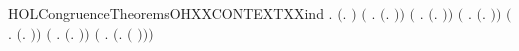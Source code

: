 \begin{SaveVerbatim}{HOLCongruenceTheoremsOHXXCONTEXTXXind}
\HOLTokenTurnstile{} \HOLSymConst{\HOLTokenForall{}}.
        \ensuremath{(}\HOLTokenLambda{}. \ensuremath{)} \HOLSymConst{\HOLTokenConj{}}
       \ensuremath{(}\HOLSymConst{\HOLTokenForall{}} .   \HOLSymConst{\HOLTokenImp{}}  \ensuremath{(}\HOLTokenLambda{}. \HOLSymConst{\ensuremath{\ldotp}} \ensuremath{)}\ensuremath{)} \HOLSymConst{\HOLTokenConj{}}
       \ensuremath{(}\HOLSymConst{\HOLTokenForall{}} .   \HOLSymConst{\HOLTokenImp{}}  \ensuremath{(}\HOLTokenLambda{}.   \HOLSymConst{\ensuremath{+}} \ensuremath{)}\ensuremath{)} \HOLSymConst{\HOLTokenConj{}}
       \ensuremath{(}\HOLSymConst{\HOLTokenForall{}} .   \HOLSymConst{\HOLTokenImp{}}  \ensuremath{(}\HOLTokenLambda{}.  \HOLSymConst{\ensuremath{+}}  \ensuremath{)}\ensuremath{)} \HOLSymConst{\HOLTokenConj{}}
       \ensuremath{(}\HOLSymConst{\HOLTokenForall{}} .   \HOLSymConst{\HOLTokenImp{}}  \ensuremath{(}\HOLTokenLambda{}.   \HOLSymConst{\ensuremath{\mid}} \ensuremath{)}\ensuremath{)} \HOLSymConst{\HOLTokenConj{}}
       \ensuremath{(}\HOLSymConst{\HOLTokenForall{}} .   \HOLSymConst{\HOLTokenImp{}}  \ensuremath{(}\HOLTokenLambda{}.  \HOLSymConst{\ensuremath{\mid}}  \ensuremath{)}\ensuremath{)} \HOLSymConst{\HOLTokenConj{}}
       \ensuremath{(}\HOLSymConst{\HOLTokenForall{}} .   \HOLSymConst{\HOLTokenImp{}}  \ensuremath{(}\HOLTokenLambda{}.   \ensuremath{(} \ensuremath{)}\ensuremath{)}\ensuremath{)} \HOLSymConst{\HOLTokenConj{}}

\end{SaveVerbatim}
